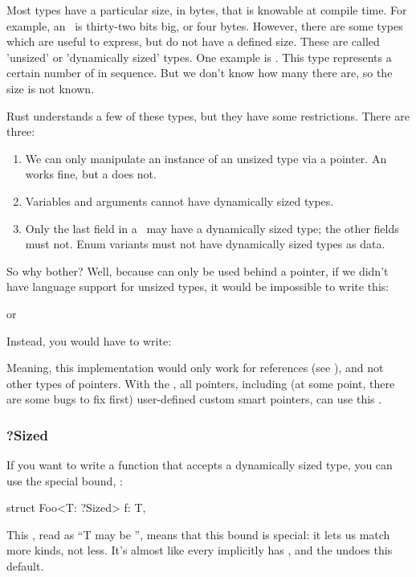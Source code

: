 Most types have a particular size, in bytes, that is knowable at compile time. For example, an \itt\ is thirty-two bits big, or four bytes. 
However, there are some types which are useful to express, but do not have a defined size. These are called 'unsized' or 'dynamically sized' 
types. One example is \code{[T]}. This type represents a certain number of  in sequence. But we don't know how many there are, so 
the size is not known.

\blank

Rust understands a few of these types, but they have some restrictions. There are three:

\begin{enumerate}
  \item{We can only manipulate an instance of an unsized type via a pointer. An \code{\&[T]} works fine, but a \code{[T]} does not.}
  \item{Variables and arguments cannot have dynamically sized types.}
  \item{Only the last field in a \struct\ may have a dynamically sized type; the other fields must not. Enum variants must not have 
      dynamically sized types as data.}
\end{enumerate}

So why bother? Well, because \code{[T]} can only be used behind a pointer, if we didn't have language support for unsized types, 
it would be impossible to write this:

\begin{rustc}
impl Foo for str {
\end{rustc}

or

\begin{rustc}
impl<T> Foo for [T] {
\end{rustc}

Instead, you would have to write:

\begin{rustc}
impl Foo for &str {
\end{rustc}

Meaning, this implementation would only work for references (see ), and not other types of pointers. 
With the , all pointers, including (at some point, there are some bugs to fix first) user-defined custom smart pointers, 
can use this .

\subsubsection*{?Sized}

If you want to write a function that accepts a dynamically sized type, you can use the special bound, :

\begin{rustc}
struct Foo<T: ?Sized> {
    f: T,
}
\end{rustc}

This , read as \enquote{T may be }, means that this bound is special: it lets us match more kinds, not less. It's almost 
like every  implicitly has , and the  undoes this default.

